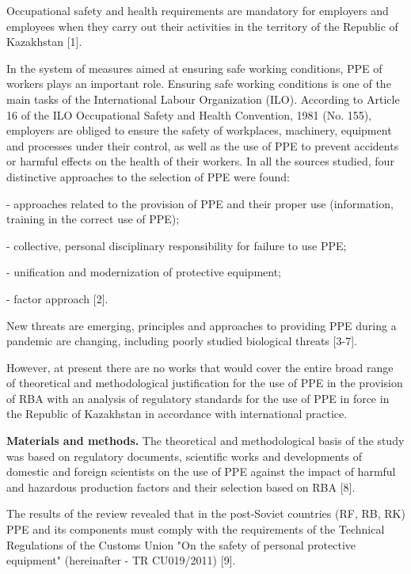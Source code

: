 {Occupational safety and health requirements are mandatory for employers
and employees when they carry out their activities in the territory of
the Republic of Kazakhstan {[}1{]}.

In the system of measures aimed at ensuring safe working conditions, PPE
of workers plays an important role. Ensuring safe working conditions is
one of the main tasks of the International Labour Organization (ILO).
According to Article 16 of the ILO Occupational Safety and Health
Convention, 1981 (No. 155), employers are obliged to ensure the safety
of workplaces, machinery, equipment and processes under their control,
as well as the use of PPE to prevent accidents or harmful effects on the
health of their workers. In all the sources studied, four distinctive
approaches to the selection of PPE were found:

- approaches related to the provision of PPE and their proper use
(information, training in the correct use of PPE);

- collective, personal disciplinary responsibility for failure to use
PPE;

- unification and modernization of protective equipment;

- factor approach {[}2{]}.

New threats are emerging, principles and approaches to providing PPE
during a pandemic are changing, including poorly studied biological
threats {[}3-7{]}.

However, at present there are no works that would cover the entire broad
range of theoretical and methodological justification for the use of PPE
in the provision of RBA with an analysis of regulatory standards for the
use of PPE in force in the Republic of Kazakhstan in accordance with
international practice.

{\bfseries Materials and methods.} The theoretical and methodological basis
of the study was based on regulatory documents, scientific works and
developments of domestic and foreign scientists on the use of PPE
against the impact of harmful and hazardous production factors and their
selection based on RBA {[}8{]}.

The results of the review revealed that in the post-Soviet countries
(RF, RB, RK) PPE and its components must comply with the requirements of
the Technical Regulations of the Customs Union "On the safety of
personal protective equipment" (hereinafter - TR CU019/2011) {[}9{]}.

}
